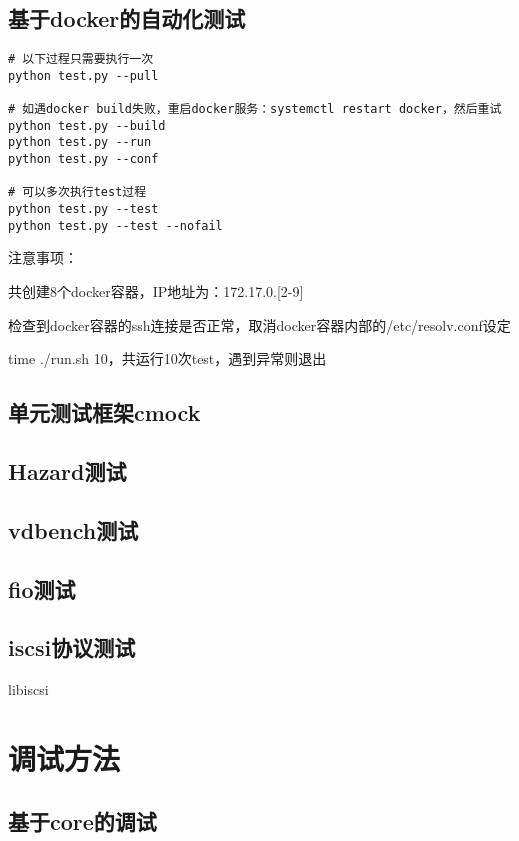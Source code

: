 \subsection{基于docker的自动化测试}

\begin{lstlisting}
# 以下过程只需要执行一次
python test.py --pull

# 如遇docker build失败，重启docker服务：systemctl restart docker，然后重试
python test.py --build
python test.py --run
python test.py --conf

# 可以多次执行test过程
python test.py --test
python test.py --test --nofail
\end{lstlisting}

注意事项：
\begin{compactenum}
\item 共创建8个docker容器，IP地址为：172.17.0.[2-9]
\item 检查到docker容器的ssh连接是否正常，取消docker容器内部的/etc/resolv.conf设定
\item time ./run.sh 10，共运行10次test，遇到异常则退出
\end{compactenum}

\subsection{单元测试框架cmock}

\subsection{Hazard测试}
\subsection{vdbench测试}
\subsection{fio测试}
\subsection{iscsi协议测试}

libiscsi

\section{调试方法}

\subsection{基于core的调试}

